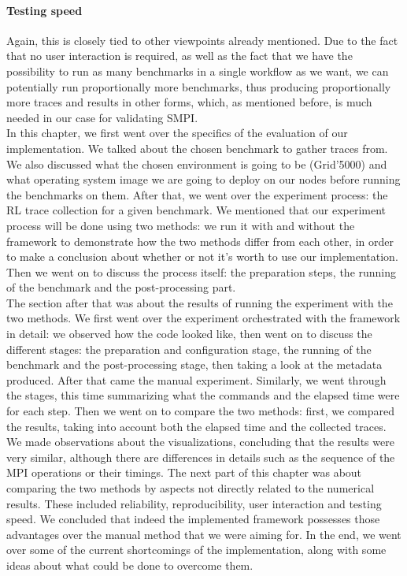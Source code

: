 \paragraph{Testing speed}
Again, this is closely tied to other viewpoints already mentioned. Due
to the fact that no user interaction is required, as well as the fact
that we have the possibility to run as many benchmarks in a single
workflow as we want, we can potentially run proportionally more
benchmarks, thus producing proportionally more traces and results in
other forms, which, as mentioned before, is much needed in our case
for validating SMPI.\\[0.5cm]
In this chapter, we first went over the specifics of the evaluation of
our implementation. We talked about the chosen benchmark to
gather traces from. We also discussed what the chosen
environment is going to be (Grid'5000) and what operating system image
we are going to deploy on our nodes before running the benchmarks on
them. After that, we went over the experiment process: the RL trace
collection for a given benchmark. We mentioned that our experiment
process will be done using two methods: we run it with and without the
framework to demonstrate how the two methods differ from each
other, in order to make a conclusion about whether or not it's worth
to use our implementation. Then we went on to discuss the process
itself: the preparation steps, the running of the benchmark and the
post-processing part.\\
The section after that was about the results of running the
experiment with the two methods. We first went over the experiment
orchestrated with the framework in detail: we observed how the code
looked like, then went on to discuss the different stages: the
preparation and configuration stage, the running of the benchmark and
the post-processing stage, then taking a look at the metadata
produced. After that came the manual experiment. Similarly, we went
through the stages, this time summarizing what the commands and the
elapsed time were for each step. Then we went on to compare the two
methods: first, we compared the results, taking into account both the
elapsed time and the collected traces. We made observations about the
visualizations, concluding that the results were very similar,
although there are differences in details such as the sequence of the
MPI operations or their timings. The next part of this chapter was
about comparing the two methods by aspects not directly related to the
numerical results. These included reliability, reproducibility, user
interaction and testing speed. We concluded that indeed the
implemented framework possesses those advantages over the manual
method that we were aiming for. In the end, we went over some of the
current shortcomings of the implementation, along with some ideas
about what could be done to overcome them.
